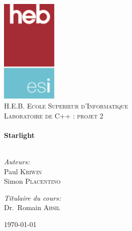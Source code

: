 \begin{titlepage}
	\begin{center}

		\includegraphics[keepaspectratio=true,width=0.20\textwidth]{./logo}\\[1cm]

		\textsc{\LARGE H.E.B. Ecole Superieur d'Informatique}\\[1.5cm]

		\textsc{\Large Laboratoire de C++ : projet 2}\\[0.5cm]

		\HRule \\[0.4cm]
		{\huge \bfseries Starlight \\[0.4cm]}
		\HRule \\[1.5cm]

		\noindent
		\begin{minipage}[t]{0.4\textwidth}
			\begin{flushleft} \large
				\emph{Auteurs:}\\
				Paul \textsc{Kriwin}\\
				Simon \textsc{Placentino}
			\end{flushleft}
		\end{minipage}%
		\begin{minipage}[t]{0.4\textwidth}
			\begin{flushright} \large
				\emph{Titulaire du cours:} \\
				Dr.~Romain \textsc{Absil}
			\end{flushright}
		\end{minipage}

		\vfill

		{\large \today}

	\end{center}
	\clearpage\null\newpage
\end{titlepage}
